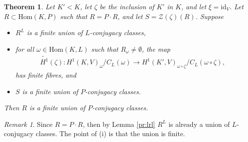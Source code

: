 \documentclass[12pt]{amsart}
\numberwithin{equation}{section}
\newtheorem{thm}[equation]{Theorem}
\theoremstyle{definition}
\theoremstyle{remark}
\theoremstyle{remark}
\newtheorem*{Rem}{Remark}
\begin{document}
\begin{thm}\label{main_thm} Let $K'<K$, let $\zeta$ be the inclusion of $K'$ in $K$, and let $\xi=\mathrm{id}_V$. Let $R \subset \mathrm{Hom}(K, P)$ such that $R = P \cdot R$, and let $S = \mathcal{Z}(\zeta)(R)$. Suppose
\begin{itemize}
\item[(i)] $R^L$ is a finite union of $L$-conjugacy classes,
\item[(ii)] for all $\omega \in \mathrm{Hom}(K, L)$ such that $R_\omega \neq \emptyset$, the map
\begin{align*}
	\tilde{H^1}(\zeta):H^1(K, V)_\omega/C_L(\omega) \rightarrow H^1(K', V)_{\omega\circ\zeta}/C_L(\omega\circ\zeta),
\end{align*}
has finite fibres, and
\item[(iii)] $S$ is a finite union of $P$-conjugacy classes.
\end{itemize}
Then $R$ is a finite union of $P$-conjugacy classes.
\end{thm}
\begin{Rem}
Since $R = P \cdot R$, then by Lemma \ref{pr:lrl} $R^L$ is already a union of $L$-conjugacy classes. The point of (i) is that the union is finite.
\end{Rem}
\end{document}
